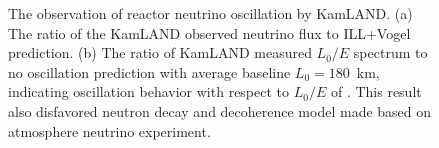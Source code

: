     \begin{figure}[h!]
    \centering
    \caption[Confirmation of Reactor Neutrino Oscillation by KamLAND]{The observation of reactor neutrino oscillation by KamLAND.
    (a) The ratio of the KamLAND observed neutrino flux to ILL+Vogel prediction.
    (b) The ratio of KamLAND measured $L_0/E$ spectrum to no oscillation prediction with average baseline $L_0 = 180$~km, indicating oscillation behavior with respect to $L_0/E$ of \nuebar.
    This result also disfavored neutron decay and decoherence model made based on atmosphere neutrino experiment.}
    \label{fig:Kamland}
    \end{figure}
    
